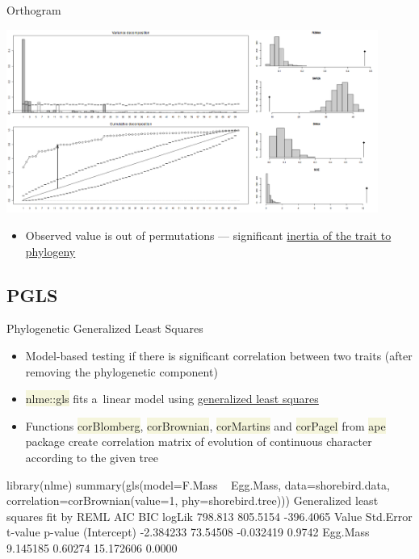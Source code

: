 \documentclass[compress, xelatex, 11pt, xcolor=svgnames, aspectratio=169,
	hyperref={
		bookmarks=true,
		unicode=true,
		colorlinks=true,
		pdftitle={Molecular data in R},
		plainpages=false,
		pdfauthor={Vojtech Zeisek},
		pdfsubject={Course about phylogeny and evolution in R},
		pdfcreator={XeLaTeX},
		pdfkeywords={R, evolution, phylogeny, molecular data},
		linkcolor=Crimson, %
		anchorcolor=Magenta, %
		citecolor=Magenta, %
		filecolor=Magenta, %
		menucolor=Magenta, %
		urlcolor=DodgerBlue, %
		},
	url={hyphens, lowtilde} %
	]{beamer}
\renewcommand{\texttt}[1]{\colorbox{Beige}{{\ttfamily #1}}}
\begin{document}
\begin{frame}{Orthogram}
	\begin{center}
		\includegraphics[height=6cm]{orthogram.png}
	\end{center}
	\begin{itemize}
		\item Observed value is out of permutations --- significant \href{https://en.wikipedia.org/wiki/Phylogenetic_inertia}{inertia of the trait to phylogeny}
	\end{itemize}
\end{frame}

\subsection{PGLS}

\begin{frame}[fragile]{Phylogenetic Generalized Least Squares}
	\begin{itemize}
		\item Model-based testing if there is significant correlation between two traits (after removing the phylogenetic component)
		\item \texttt{nlme::gls} fits a~linear model using \href{https://en.wikipedia.org/wiki/Generalized_least_squares}{generalized least squares}
		\item Functions \texttt{corBlomberg}, \texttt{corBrownian}, \texttt{corMartins} and \texttt{corPagel} from \texttt{ape} package create correlation matrix of evolution of continuous character according to the given tree
	\end{itemize}
	\begin{spluscode}
    library(nlme)
    summary(gls(model=F.Mass ~ Egg.Mass, data=shorebird.data,
      correlation=corBrownian(value=1, phy=shorebird.tree)))
      Generalized least squares fit by REML
          AIC      BIC    logLik
      798.813 805.5154 -396.4065
                    Value Std.Error   t-value p-value
    (Intercept) -2.384233  73.54508 -0.032419  0.9742
    Egg.Mass     9.145185   0.60274 15.172606  0.0000
\end{spluscode}
\end{frame}
\end{document}

